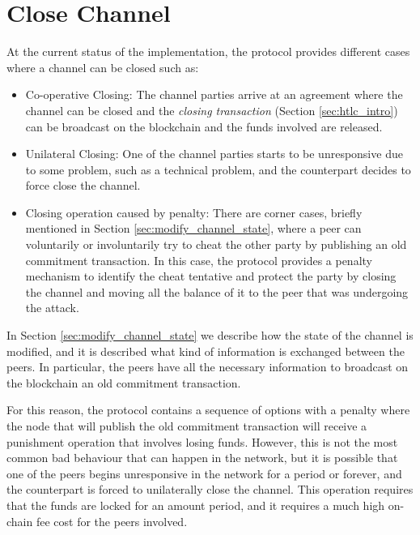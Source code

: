 \section{Close {\LN} Channel}
\label{sec:close_operation}

At the current status of the implementation, the {\LN} protocol provides different cases where a channel can be closed such as:

\begin{itemize}
  \item Co-operative Closing: The channel parties arrive at an agreement where the channel can be closed and the
        \emph{closing transaction} (Section \ref{sec:htlc_intro}) can be broadcast on the blockchain and the funds involved are released.
  \item Unilateral Closing: One of the channel parties starts to be unresponsive due to some problem, such as a technical problem, and the counterpart decides to force close the channel.
  
  \item Closing operation caused by penalty: There are corner cases, briefly mentioned in Section \ref{sec:modify_channel_state}, where a peer can voluntarily or involuntarily try to cheat the other party by publishing an old commitment transaction. In this case, the protocol provides a penalty mechanism to identify the cheat tentative and protect the party by closing the channel and moving all the balance of it to the peer that was undergoing the attack.
\end{itemize}

In Section \ref{sec:modify_channel_state} we describe how the state of the channel is modified, and it is described what kind of information is
exchanged between the peers. In particular, the peers have all the necessary information to broadcast on the blockchain an old commitment transaction.

For this reason, the protocol contains a sequence of options with a penalty where the node that will publish the old commitment transaction
will receive a punishment operation that involves losing funds. However, this is not the most common bad behaviour that can happen in
the network, but it is possible that one of the peers begins unresponsive in the network for a period or forever, and the counterpart is forced to unilaterally close the channel. This operation
requires that the funds are locked for an amount period, and it requires a much high on-chain fee cost for the peers involved.

